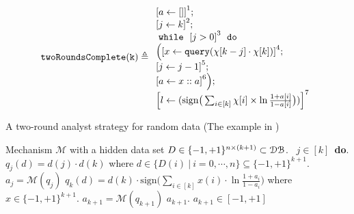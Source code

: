     \begin{example}
        \label{ex:twoRoundsComplete}
        \[
            \kw{twoRoundsComplete(k)} \triangleq
        \begin{array}{l}
               \clabel{ a \leftarrow []}^{1} ; \\
                \clabel{\assign{j}{k} }^{2} ; \\
                \ewhile ~ \clabel{j > 0}^{3} ~ \edo ~ \\
                \Big(
                 \clabel{\assign{x}{\query(\chi[k - j]\cdot \chi[k])} }^{4}  ; \\
                 \clabel{\assign{j}{j-1}}^{5} ;\\
                \clabel{a \leftarrow x :: a}^{6}       \Big);\\
                \clabel{l \leftarrow (\mathrm{sign}\big (\sum_{i\in [k]} \chi[i]\times\ln\frac{1+a[i]}{1-a[i]} \big ))}^{7}\\
            \end{array}
        \]
        \begin{algorithm}
        \footnotesize
        \caption{A two-round analyst strategy for random data (The example in  \cite{dwork2015preserving})}
        \label{alg:twoRound}
        \begin{algorithmic}
        \REQUIRE Mechanism $\mathcal{M}$ with a hidden data set $D \in \{-1,+1\}^{n\times (k+1)} \subset \mathcal{DB}$.
        \ $j\in [k]$\ {\bf do}.  
        \STATE {} $q_j(d)=d(j)\cdot d(k)$ where $d \in \{D(i) ~|~ i = 0, \cdots, n\} \subseteq \{-1,+1\}^{k+1}$.
        \STATE {} $a_j=\mathcal{M}(q_j)$ 
        \STATE \qquad {}
         $q_{k}(d)= d(k) \cdot \mathrm{sign}\big (\sum_{i\in [k]} x(i) \cdot \ln\frac{1+a_i}{1-a_i} \big )$ where $x\in \{-1,+1\}^{k+1}$.
        \STATE{}
         $a_{k+1}=\mathcal{M}(q_{k+1})$
        \STATE{}
        \RETURN $a_{k+1}$.
        \ENSURE $a_{k+1}\in [-1,+1]$
        \end{algorithmic}
        \end{algorithm}
        \end{example}
    
